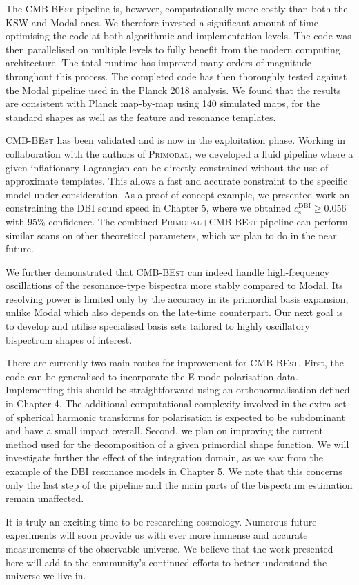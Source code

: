 The \textsc{CMB-BEst} pipeline is, however, computationally more costly than both the KSW and Modal ones. We therefore invested a significant amount of time optimising the code at both algorithmic and implementation levels. The code was then parallelised on multiple levels to fully benefit from the modern computing architecture. The total runtime has improved many orders of magnitude throughout this process. The completed code has then thoroughly tested against the Modal pipeline used in the Planck 2018 analysis. We found that the results are consistent with Planck map-by-map using 140 simulated maps, for the standard shapes as well as the feature and resonance templates.

\textsc{CMB-BEst} has been validated and is now in the exploitation phase. Working in collaboration with the authors of \textsc{Primodal}, we developed a fluid pipeline where a given inflationary Lagrangian can be directly constrained without the use of approximate templates. This allows a fast and accurate constraint to the specific model under consideration. As a proof-of-concept example, we presented work on constraining the DBI sound speed in Chapter 5, where we obtained $c_\text{s}^\text{DBI} \ge 0.056$ with 95\% confidence. The combined \textsc{Primodal}+\textsc{CMB-BEst} pipeline can perform similar scans on other theoretical parameters, which we plan to do in the near future.

We further demonstrated that \textsc{CMB-BEst} can indeed handle high-frequency oscillations of the resonance-type bispectra more stably compared to Modal. Its resolving power is limited only by the accuracy in its primordial basis expansion, unlike Modal which also depends on the late-time counterpart. Our next goal is to develop and utilise specialised basis sets tailored to highly oscillatory bispectrum shapes of interest. 

There are currently two main routes for improvement for \textsc{CMB-BEst}. First, the code can be generalised to incorporate the E-mode polarisation data. Implementing this should be straightforward using an orthonormalisation defined in Chapter 4. The additional computational complexity involved in the extra set of spherical harmonic transforms for polarisation is expected to be subdominant and have a small impact overall. Second, we plan on improving the current method used for the decomposition of a given primordial shape function. We will investigate further the effect of the integration domain, as we saw from the example of the DBI resonance models in Chapter 5. We note that this concerns only the last step of the pipeline and the main parts of the bispectrum estimation remain unaffected.

It is truly an exciting time to be researching cosmology. Numerous future experiments will soon provide us with ever more immense and accurate measurements of the observable universe. We believe that the work presented here will add to the community's continued efforts to better understand the universe we live in.
